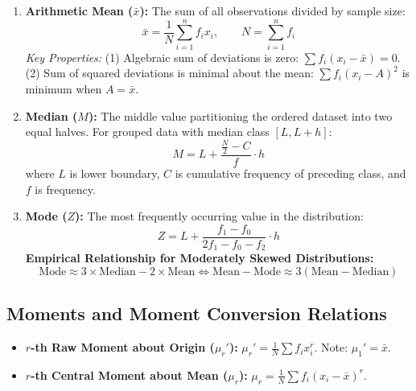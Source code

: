 \documentclass[12pt,a4paper]{article}
\begin{document}
\begin{tcolorbox}[defbox, title={\textbf{Definition: Measures of Central Tendency}}]
\begin{enumerate}[leftmargin=*, itemsep=2pt, topsep=2pt]
  \item \textbf{Arithmetic Mean ($\bar{x}$):} The sum of all observations divided by sample size:
  \begin{equation}
    \bar{x} = \frac{1}{N} \sum_{i=1}^n f_i x_i, \qquad N = \sum_{i=1}^n f_i
  \end{equation}
  \textit{Key Properties:} (1) Algebraic sum of deviations is zero: $\sum f_i (x_i - \bar{x}) = 0$. (2) Sum of squared deviations is minimal about the mean: $\sum f_i (x_i - A)^2$ is minimum when $A = \bar{x}$.
  \item \textbf{Median ($M$):} The middle value partitioning the ordered dataset into two equal halves. For grouped data with median class $[L, L+h]$:
  \begin{equation}
    M = L + \frac{\frac{N}{2} - C}{f} \cdot h
  \end{equation}
  where $L$ is lower boundary, $C$ is cumulative frequency of preceding class, and $f$ is frequency.
  \item \textbf{Mode ($Z$):} The most frequently occurring value in the distribution:
  \begin{equation}
    Z = L + \frac{f_1 - f_0}{2f_1 - f_0 - f_2} \cdot h
  \end{equation}
  \textbf{Empirical Relationship for Moderately Skewed Distributions:}
  \begin{equation}
    \text{Mode} \approx 3 \times \text{Median} - 2 \times \text{Mean} \iff \text{Mean} - \text{Mode} \approx 3(\text{Mean} - \text{Median})
  \end{equation}
\end{enumerate}
\end{tcolorbox}

\subsection{Moments and Moment Conversion Relations}
\begin{itemize}[leftmargin=*, itemsep=3pt]
  \item \textbf{$r$-th Raw Moment about Origin ($\mu_r'$):} $\mu_r' = \frac{1}{N} \sum f_i x_i^r$. Note: $\mu_1' = \bar{x}$.
  \item \textbf{$r$-th Central Moment about Mean ($\mu_r$):} $\mu_r = \frac{1}{N} \sum f_i (x_i - \bar{x})^r$.
\end{itemize}
\end{document}
